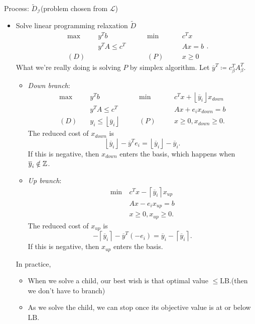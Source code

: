 Process: \(\widetilde{D}_{\mathcal{I}}\)(problem chosen from \(\mathcal{L}\))
\begin{itemize}
	\item Solve linear programming relaxation \(\widetilde{D}\)
	      \[
		      \begin{alignedat}{5}
			      \max ~&y^{T}b\qquad\qquad	&&\min~		&&c^{T}x\\
			      &y^{T}A\leq c^{T} 		&&			&&Ax = b\\
			      (D)\quad	& 				&&(P)\quad	&&x\geq  0
		      \end{alignedat}.
	      \]
	      What we're really doing is solving \(P\) by simplex algorithm. Let \(\overline{y}^{T}\coloneqq c^{T}_{\beta}A^{T}_{\beta}\).
	      \begin{itemize}
		      \item \emph{Down branch}:
		            \[
			            \begin{alignedat}{5}
				            \max ~	&y^{T}b\qquad\qquad				&&\min~	&&c^{T}x+\left\lfloor \overline{y}_{i} \right\rfloor x_{down}\\
				            &y^{T}A\leq c^{T} 				&&		&&Ax + e_{i}x_{down} = b\\
				            (D)\quad& y_{i}\leq \left\lfloor \overline{y}_{i} \right\rfloor	&&(P)\quad&&x\geq 0, x_{down}\geq 0.
			            \end{alignedat}
		            \]
		            The reduced cost of \(x_{down}\) is
		            \[
			            \left\lfloor \overline{y}_{i} \right\rfloor - \overline{y}^{T}e_{i} = \left\lfloor \overline{y}_{i} \right\rfloor - \overline{y}_{i}.
		            \]
		            If this is negative, then \(x_{down}\) enters the basis, which happens when \(\overline{y}_{i}\notin\mathbb{\MakeUppercase{Z}}\).
		      \item \emph{Up branch}:
		            \begin{align*}
			            \min~ & c^Tx  - \left\lceil \overline{y}_{i} \right\rceil x_{up} \\
			                  & Ax - e_{i}x_{up}= b                                      \\
			                  & x\geq 0, x_{up}\geq 0.
		            \end{align*}
		            The reduced cost of \(x_{up}\) is
		            \[
			            -\left\lceil \overline{y}_{i} \right\rceil - \overline{y}^{T}(-e_{i}) = \overline{y}_{i} - \left\lceil \overline{y}_{i} \right\rceil.
		            \]
		            If this is negative, then \(x_{up}\) enters the basis.
	      \end{itemize}
	      \begin{remark}
		      In practice,
		      \begin{itemize}
			      \item When we solve a child, our best wish is that optimal value \(\leq \mathrm{LB}\).(then we don't have to branch)
			      \item As we solve the child, we can stop once its objective value is at or below \(\mathrm{LB} \).
		      \end{itemize}
	      \end{remark}
\end{itemize}

